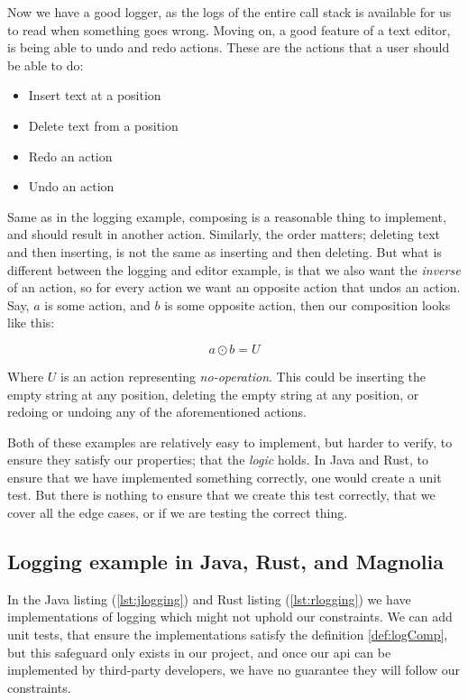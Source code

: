 Now we have a good logger, as the logs of the entire call stack is available for
us to read when something goes wrong. Moving on, a good feature of a text
editor, is being able to undo and redo actions. These are the actions that a
user should be able to do:

\begin{itemize}
  \item Insert text at a position
  \item Delete text from a position
  \item Redo an action
  \item Undo an action
\end{itemize}

Same as in the logging example, composing is a reasonable thing to implement,
and should result in another action. Similarly, the order matters; deleting text
and then inserting, is not the same as inserting and then deleting. But what is
different between the logging and editor example, is that we also want the
\textit{inverse} of an action, so for every action we want an opposite action
that undos an action. Say, $a$ is some action, and $b$ is some opposite action,
then our composition looks like this:

\begin{definition} \label{def:actComp}
  \begin{equation}
    a \odot b = U
  \end{equation}
\end{definition}

Where $U$ is an action representing \textit{no-operation}. This could be
inserting the empty string at any position, deleting the empty string at any
position, or redoing or undoing any of the aforementioned actions.

Both of these examples are relatively easy to implement, but harder to verify,
to ensure they satisfy our properties; that the \textit{logic} holds. In Java
and Rust, to ensure that we have implemented something correctly, one would
create a unit test. But there is nothing to ensure that we create this test
correctly, that we cover all the edge cases, or if we are testing the correct
thing.

\subsection{Logging example in Java, Rust, and Magnolia}

In the Java listing (\ref{lst:jlogging}) and Rust listing (\ref{lst:rlogging})
we have implementations of logging which might not uphold our constraints. We
can add unit tests, that ensure the implementations satisfy the definition
\ref{def:logComp}, but this safeguard only exists in our project, and once our
\gls*{api} can be implemented by third-party developers, we have no guarantee
they will follow our constraints.

